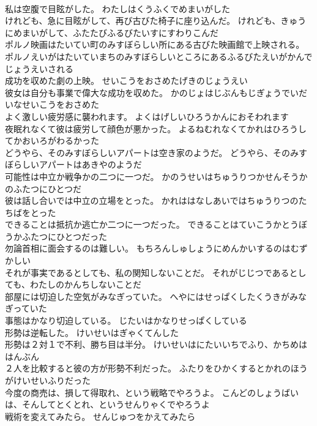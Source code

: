 \documentclass[8pt]{extreport}
\begin{document}
\begin{CJK}{UTF8}{min}
\\	私は空腹で目眩がした。	わたしはくうふくでめまいがした 
\\	けれども、急に目眩がして、再び古びた椅子に座り込んだ。	けれども、きゅうにめまいがして、ふたたびふるびたいすにすわりこんだ 
\\	ポルノ映画はたいてい町のみすぼらしい所にある古びた映画館で上映される。	ポルノえいがはたいていまちのみすぼらしいところにあるふるびたえいがかんでじょうえいされる 
\\	成功を収めた劇の上映。	せいこうをおさめたげきのじょうえい 
\\	彼女は自分も事業で偉大な成功を収めた。	かのじょはじぶんもじぎょうでいだいなせいこうをおさめた 
\\	よく激しい疲労感に襲われます。	よくはげしいひろうかんにおそわれます 
\\	夜眠れなくて彼は疲労して顔色が悪かった。	よるねむれなくてかれはひろうしてかおいろがわるかった 
\\	どうやら、そのみすぼらしいアパートは空き家のようだ。	どうやら、そのみすぼらしいアパートはあきやのようだ 
\\	可能性は中立か戦争かの二つに一つだ。	かのうせいはちゅうりつかせんそうかのふたつにひとつだ 
\\	彼は話し合いでは中立の立場をとった。	かれははなしあいではちゅうりつのたちばをとった 
\\	できることは抵抗か逃亡か二つに一つだった。	できることはていこうかとうぼうかふたつにひとつだった 
\\	勿論首相に面会するのは難しい。	もちろんしゅしょうにめんかいするのはむずかしい 
\\	それが事実であるとしても、私の関知しないことだ。	それがじじつであるとしても、わたしのかんちしないことだ 
\\	部屋には切迫した空気がみなぎっていた。	へやにはせっぱくしたくうきがみなぎっていた 
\\	事態はかなり切迫している。	じたいはかなりせっぱくしている 
\\	形勢は逆転した。	けいせいはぎゃくてんした 
\\	形勢は２対１で不利、勝ち目は半分。	けいせいはにたいいちでふり、かちめははんぶん 
\\	２人を比較すると彼の方が形勢不利だった。	ふたりをひかくするとかれのほうがけいせいふりだった 
\\	今度の商売は、損して得取れ、という戦略でやろうよ。	こんどのしょうばいは、そんしてとくとれ、というせんりゃくでやろうよ 
\\	戦術を変えてみたら。	せんじゅつをかえてみたら 

\end{CJK}
\end{document}

